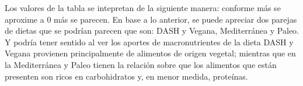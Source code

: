 \documentclass[12pt,a4paper]{article}
\begin{document}
{        Los valores de la tabla se intepretan de la siguiente manera: conforme más se aproxime 
        a $0$ más se parecen. En base a lo anterior, se puede apreciar dos parejas de dietas 
        que se podrían parecen que son: DASH y Vegana, Mediterránea y Paleo. Y podría tener sentido 
        al ver los aportes de macronutrientes de la dieta DASH y Vegana provienen principalmente de 
        alimentos de origen vegetal; mientras que en la Mediterránea y Paleo tienen la relación sobre 
        que los alimentos que están presenten son ricos en carbohidratos y, en menor medida, proteínas.
    }

\newpage

{
    \printbibliography[heading=bibintoc,title={Referencias Bibliográficas}]
}
\end{document}
